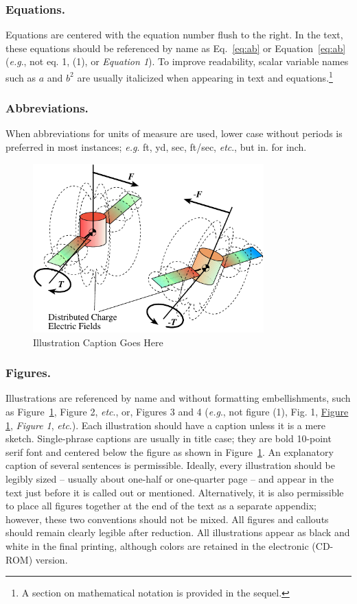 \documentclass[letterpaper, preprint, paper,11pt]{AAS}	%
\begin{document}
\subsubsection{Equations.} 
Equations are centered with the equation number flush to the right. In the text, these equations should be referenced by name as Eq.~\eqref{eq:ab} or Equation~\eqref{eq:ab} (\emph{e.g}., not eq. 1, (1), or \emph{Equation 1}). To improve readability, scalar variable names such as $a$ and $b^{2}$ are usually italicized when appearing in text and equations.\footnote{A section on mathematical notation is provided in the sequel.}



\subsubsection{Abbreviations.} 
When abbreviations for units of measure are used, lower case without periods is preferred in most instances; \emph{e.g}. ft, yd, sec, ft/sec, \emph{etc}., but in. for inch.




\begin{figure}[htb]
	\centering\includegraphics[width=3.5in]{Figures/test}
	\caption{Illustration Caption Goes Here}
	\label{fig:xxx}
\end{figure}

\subsubsection{Figures.}   
Illustrations are referenced by name and without formatting embellishments, such as Figure~\ref{fig:xxx}, Figure 2, \emph{etc}., or, Figures 3 and 4 (\emph{e.g}., not figure (1), Fig. 1, \underline{Figure 1}, \emph{Figure 1}, \emph{etc}.). Each illustration should have a caption unless it is a mere sketch. Single-phrase captions are usually in title case; they are bold 10-point serif font and centered below the figure as shown in Figure~\ref{fig:xxx}. An explanatory caption of several sentences is permissible. Ideally, every illustration should be legibly sized -- usually about one-half or one-quarter page -- and appear in the text just before it is called out or mentioned. Alternatively, it is also permissible to place all figures together at the end of the text as a separate appendix; however, these two conventions should not be mixed. All figures and callouts should remain clearly legible after reduction. All illustrations appear as black and white in the final printing, although colors are retained in the electronic (CD-ROM) version.
\end{document}
